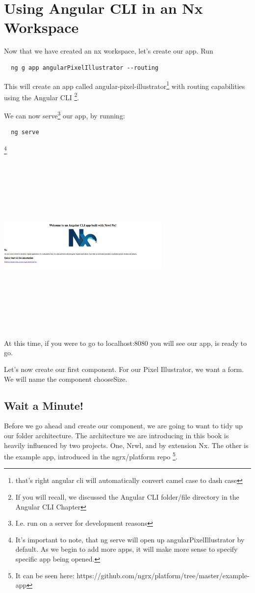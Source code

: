 
\chapter{ Using Angular CLI in an Nx Workspace }

Now that we have created an nx workspace, let's create our app. Run
\begin{verbatim}
  ng g app angularPixelIllustrator --routing
\end{verbatim}

This will create an app called angular-pixel-illustrator\footnote{that's right
angular cli will automatically convert camel case to dash case} with routing
capabilities using the Angular CLI \footnote{If you will recall, we discussed
the Angular CLI folder/file directory in the Angular CLI Chapter}.

We can now serve\footnote{I.e. run on a server for development reasons} our app,
by running:
\begin{verbatim}
  ng serve
\end{verbatim}
\footnote{It's important to note, that ng serve will open up
angularPixelIllustrator by default. As we begin to add more apps, it will make
more sense to specify specific app being opened.}

\includegraphics[width=8.5cm, height=9cm]{dev-tools/angular-cli-post-nx/angular_nx_initial_screen}

At this time, if you were to go to localhost:8080 you will see our app, is
ready to go.

Let's now create our first component. For our Pixel Illustrator, we want a form.
We will name the component chooseSize.

\section {Wait a Minute!}
Before we go ahead and create our component, we are going to want to tidy up
our folder architecture. The architecture we are introducing in this book is
heavily influenced by two projects. One, Nrwl, and by extension Nx. The other is
the example app, introduced in the ngrx/platform repo \footnote{It can be seen
here: https://github.com/ngrx/platform/tree/master/example-app}.

